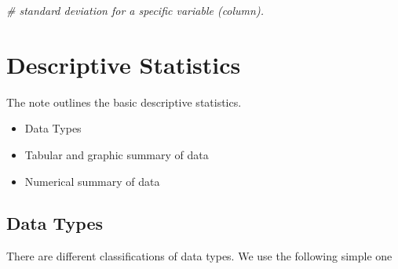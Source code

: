 \documentclass[
]{book}
\newenvironment{Shaded}{\begin{snugshade}}{\end{snugshade}}
\newcommand{\CommentTok}[1]{\textcolor[rgb]{0.56,0.35,0.01}{\textit{#1}}}
\providecommand{\tightlist}{%
  \setlength{\itemsep}{0pt}\setlength{\parskip}{0pt}}
\begin{document}
\begin{Shaded}
\begin{Highlighting}[]
                 \CommentTok{\# standard deviation for a specific variable (column).}
\end{Highlighting}
\end{Shaded}

\hypertarget{descriptive-statistics}{%
\chapter{Descriptive Statistics}\label{descriptive-statistics}}

The note outlines the basic descriptive statistics.

\begin{itemize}
\tightlist
\item
  Data Types
\item
  Tabular and graphic summary of data
\item
  Numerical summary of data
\end{itemize}

\hypertarget{data-types}{%
\section{Data Types}\label{data-types}}

There are different classifications of data types. We use the following simple one
\end{document}
